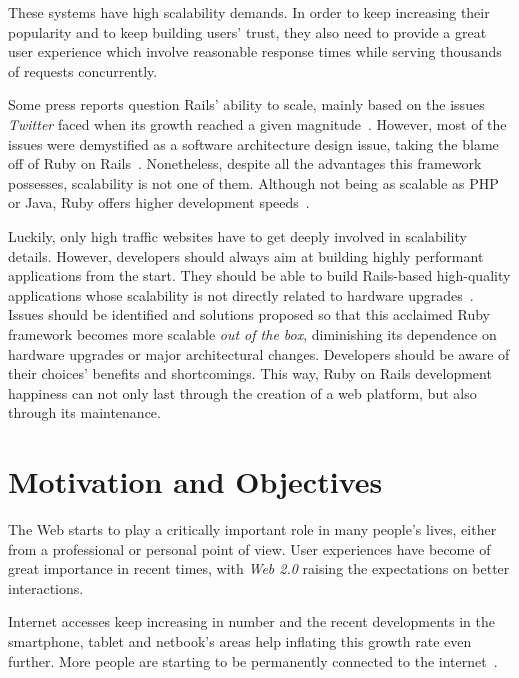 These systems have high scalability demands. In order to keep increasing their popularity and to keep building users' trust, they also need to provide a great user experience which involve reasonable response times while serving thousands of requests concurrently.

Some press reports question Rails' ability to scale, mainly based on the issues \textit{Twitter} faced when its growth reached a given magnitude~\cite{interview_alex_payne}. However, most of the issues were demystified as a software architecture design issue, taking the blame off of Ruby on Rails~\cite{ror_ecosystem_whitepaper}. Nonetheless, despite all the advantages this framework possesses, scalability is not one of them. Although not being as scalable as PHP or Java, Ruby offers higher development speeds~\cite{issues_web_frameworks}.

Luckily, only high traffic websites have to get deeply involved in scalability details. However, developers should always aim at building highly performant applications from the start. They should be able to build Rails-based high-quality applications whose scalability is not directly related to hardware upgrades~\cite{interview_alex_payne}. Issues should be identified and solutions proposed so that this acclaimed Ruby framework becomes more scalable \textit{out of the box}, diminishing its dependence on hardware upgrades or major architectural changes. Developers should be aware of their choices' benefits and shortcomings. This way, Ruby on Rails development happiness can not only last through the creation of a web platform, but also through its maintenance.

\section{Motivation and Objectives} %
\label{sec:motivation_and_objectives}
The Web starts to play a critically important role in many people's lives, either from a professional or personal point of view. User experiences have become of great importance in recent times, with \textit{Web 2.0} raising the expectations on better interactions.

Internet accesses keep increasing in number and the recent developments in the smartphone, tablet and netbook's areas help inflating this growth rate even further. More people are starting to be permanently connected to the internet~\cite{npd:3g,mobileweb,netbooks}.

